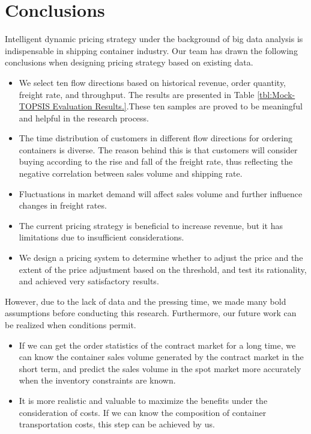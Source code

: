 \section{Conclusions}
Intelligent dynamic pricing strategy under the background of big data analysis is indispensable in shipping container industry. Our team has drawn the following conclusions when designing pricing strategy based on existing data.
\begin{itemize}
    \item We select ten flow directions based on historical revenue, order quantity, freight rate, and throughput. The results are presented in Table \ref{tbl:Mock-TOPSIS Evaluation Results.}.These ten samples are proved to be meaningful and helpful in the research process.
    \item The time distribution of customers in different flow directions for ordering containers is diverse. The reason behind this is that customers will consider buying according to the rise and fall of the freight rate, thus reflecting the negative correlation between sales volume and shipping rate.
    \item Fluctuations in market demand will affect sales volume and further influence changes in freight rates.
    \item The current pricing strategy is beneficial to increase revenue, but it has limitations due to insufficient considerations.
    \item We design a pricing system to determine whether to adjust the price and the extent of the price adjustment based on the threshold, and test its rationality, and achieved very satisfactory results.
\end{itemize}

However, due to the lack of data and the pressing time, we made many bold assumptions before conducting this research. Furthermore, our future work can be realized when conditions permit.
\begin{itemize}
    \item If we can get the order statistics of the contract market for a long time, we can know the container sales volume generated by the contract market in the short term, and predict the sales volume in the spot market more accurately when the inventory constraints are known\parencite{dynamic-pricing}.
    \item It is more realistic and valuable to maximize the benefits under the consideration of costs. If we can know the composition of container transportation costs, this step can be achieved by us.
\end{itemize}
